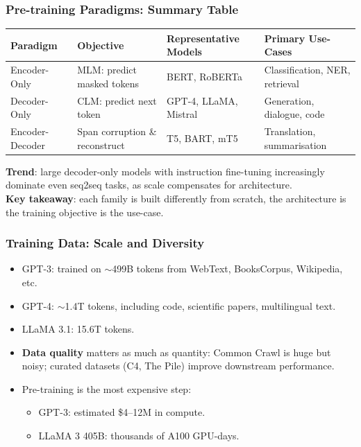 \begin{frame}[fragile]\frametitle{Pre-training Paradigms: Summary Table}
\begin{center}
\small
\renewcommand{\arraystretch}{1.3}
\begin{tabular}{|p{2cm}|p{2cm}|p{2cm}|p{2cm}|}
\hline
\textbf{Paradigm} & \textbf{Objective} & \textbf{Representative Models} & \textbf{Primary Use-Cases} \\
\hline
Encoder-Only & MLM: predict masked tokens & BERT, RoBERTa & Classification, NER, retrieval \\
\hline
Decoder-Only & CLM: predict next token & GPT-4, LLaMA, Mistral & Generation, dialogue, code \\
\hline
Encoder-Decoder & Span corruption \& reconstruct & T5, BART, mT5 & Translation, summarisation \\
\hline
\end{tabular}
\end{center}

\vspace{0.4em}
\textbf{Trend}: large decoder-only models with instruction fine-tuning increasingly dominate even seq2seq tasks, as scale compensates for architecture.\\[0.3em]
\textbf{Key takeaway}: each family is built differently from scratch,  the architecture is the training objective is the use-case.
\end{frame}

\begin{frame}[fragile]\frametitle{Training Data: Scale and Diversity}
\begin{itemize}
\item GPT-3: trained on $\sim$499B tokens from WebText, BooksCorpus, Wikipedia, etc.
\item GPT-4: $\sim$1.4T tokens, including code, scientific papers, multilingual text.
\item LLaMA 3.1: 15.6T tokens.
\item \textbf{Data quality} matters as much as quantity: Common Crawl is huge but noisy; curated datasets (C4, The Pile) improve downstream performance.
\item Pre-training is the most expensive step:
  \begin{itemize}
  \item GPT-3: estimated \$4–12M in compute.
  \item LLaMA 3 405B: thousands of A100 GPU-days.
  \end{itemize}
\end{itemize}
\end{frame}


